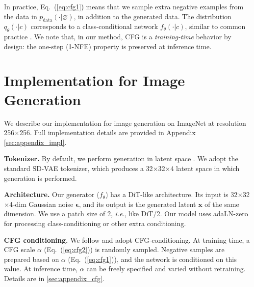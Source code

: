 \documentclass{article}
\newcommand{\vv}[1]{\mathbf{#1}}
\newcommand{\x}{\vv{x}}
\newcommand{\e}{{\boldsymbol{\epsilon}}}
\renewcommand{\paragraph}[1]{\vspace{.05em}\noindent\textbf{#1}}
\def\onedot{.}
\def\ie{\emph{i.e}\onedot} \def\Ie{\emph{I.e}\onedot}
\theoremstyle{plain}
\theoremstyle{definition}
\theoremstyle{remark}
\begin{document}

In practice, Eq.~(\ref{eq:cfg1}) means that we sample extra negative examples from the data in $p_{\text{data}}(\cdot | \varnothing)$, in addition to the generated data. The distribution $q_\theta(\cdot|c)$ corresponds to a class-conditional network $f_\theta(\cdot | c)$, similar to common practice \cite{ho2022classifier}.
We note that, in our method, CFG is a \textit{training-time} behavior by design: the one-step (1-NFE) property is preserved at inference time.





\section{Implementation for Image Generation}
\label{sec:impl}

We describe our implementation for image generation on ImageNet \cite{deng2009imagenet} at resolution 256$\times$256. Full implementation details are provided in Appendix \ref{sec:appendix_impl}.

\paragraph{Tokenizer.} By default, we perform generation in latent space \cite{rombach2022high}. We adopt the standard SD-VAE tokenizer, which produces a 32$\times$32$\times$4 latent space in which generation is performed.

\paragraph{Architecture.} Our generator ($f_\theta$) has a DiT-like \cite{peebles2023scalable} architecture.
Its input is 32$\times$32$\times$4-dim Gaussian noise $\e$, and its output is the generated latent $\x$ of the same dimension.
We use a patch size of 2, \ie, like DiT/2.
Our model uses adaLN-zero \cite{peebles2023scalable} for processing class-conditioning or other extra conditioning.


\paragraph{CFG conditioning.} We follow \cite{geng2025improved} and adopt CFG-conditioning. At training time, a CFG scale $\alpha$ (Eq.~(\ref{eq:cfg2})) is randomly sampled. Negative samples are prepared based on $\alpha$ (Eq.~(\ref{eq:cfg1})), and the network is conditioned on this value. At inference time, $\alpha$ can be freely specified and varied without retraining. Details are in \ref{sec:appendix_cfg}.
\end{document}
